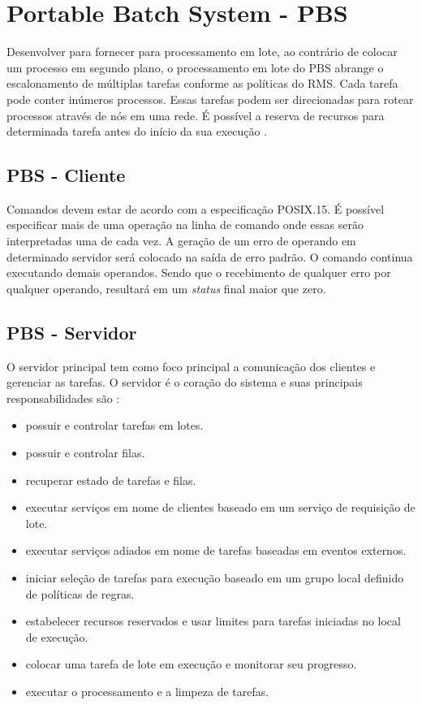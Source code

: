 \chapter{Portable Batch System - PBS}
\label{cap:pbs}

Desenvolver para fornecer para processamento em lote, ao contrário de colocar um processo em segundo plano, o processamento em lote do PBS abrange o escalonamento de múltiplas tarefas conforme as políticas do RMS. Cada tarefa pode conter inúmeros processos. Essas tarefas podem ser direcionadas para rotear processos através de nós em uma rede. É possível a reserva de recursos para determinada tarefa antes do início da sua execução \cite{Bayucan1998a}.

\section{PBS - Cliente}

Comandos devem estar de acordo com a especificação POSIX.15. É possível especificar mais de uma operação na linha de comando onde essas serão interpretadas uma de cada vez. A geração de um erro de operando em determinado servidor será colocado na saída de erro padrão. O comando continua executando demais operandos. Sendo que o recebimento de qualquer erro por qualquer operando, resultará em um \emph{status} final maior que zero.

\section{PBS - Servidor}

O servidor principal tem como foco principal a comunicação dos clientes e gerenciar as tarefas. O servidor é o coração do sistema e suas principais responsabilidades são \cite{Bayucan1998a}:

\begin{itemize}
	\item possuir e controlar tarefas em lotes.
	\item possuir e controlar filas.
	\item recuperar estado de tarefas e filas.
	\item executar serviços em nome de clientes baseado em um serviço de requisição de lote.
	\item executar serviços adiados em nome de tarefas baseadas em eventos externos.
	\item iniciar seleção de tarefas para execução baseado em um grupo local definido de políticas de regras.
	\item estabelecer recursos reservados e usar limites para tarefas iniciadas no local de execução.
	\item colocar uma tarefa de lote em execução e monitorar seu progresso.
	\item executar o processamento e a limpeza de tarefas.
\end{itemize}

